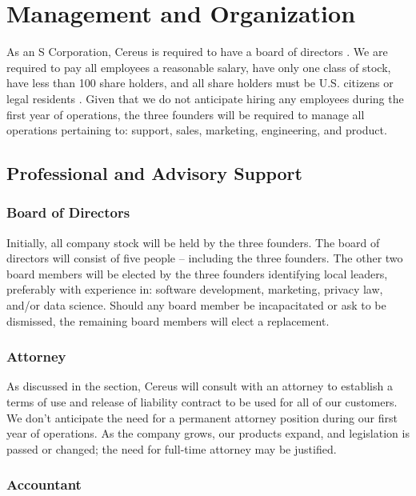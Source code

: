 {\let\cleardoublepage\relax \chapter{Management and Organization}}

As an S Corporation, Cereus is required to have a board of directors \cite{UpCounsel.2020}. We are required to pay all employees a reasonable salary, have only one class of stock, have less than 100 share holders, and all share holders must be U.S. citizens or legal residents \cite{wave.2019}. Given that we do not anticipate hiring any employees during the first year of operations, the three founders will be required to manage all operations pertaining to: support, sales, marketing, engineering, and product. 

\section{Professional and Advisory Support}

\subsection{Board of Directors}

Initially, all company stock will be held by the three founders. The board of directors will consist of five people -- including the three founders. The other two board members will be elected by the three founders identifying local leaders, preferably with experience in: software development, marketing, privacy law, and/or data science. Should any board member be incapacitated or ask to be dismissed, the remaining board members will elect a replacement.

\subsection{Attorney}

As discussed in the  section, Cereus will consult with an attorney to establish a terms of use and release of liability contract to be used for all of our customers. We don't anticipate the need for a permanent attorney position during our first year of operations. As the company grows, our products expand, and legislation is passed or changed; the need for full-time attorney may be justified. 

\subsection{Accountant}

